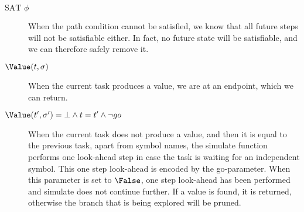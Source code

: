 \begin{description}
  \item[$\text{SAT }\phi$] When the path condition cannot be satisfied, we know that all future steps will not be satisfiable either.
  In fact, no future state will be satisfiable, and we can therefore safely remove it.
  \item[$\Value(t,\sigma)$] When the current task produces a value, we are at an endpoint, which we can return.
  \item[$\Value(t',\sigma')=\bot\land t=t'\land \neg go$] When the current task does not produce a value, and then it is equal to the previous task, apart from symbol names, the simulate function performs one look-ahead step in case the task is waiting for an independent symbol.
  This one step look-ahead is encoded by the go-parameter. When this parameter is set to $\False$, one step look-ahead has been performed and simulate does not continue further. If a value is found, it is returned, otherwise the branch that is being explored will be pruned.
\end{description}

